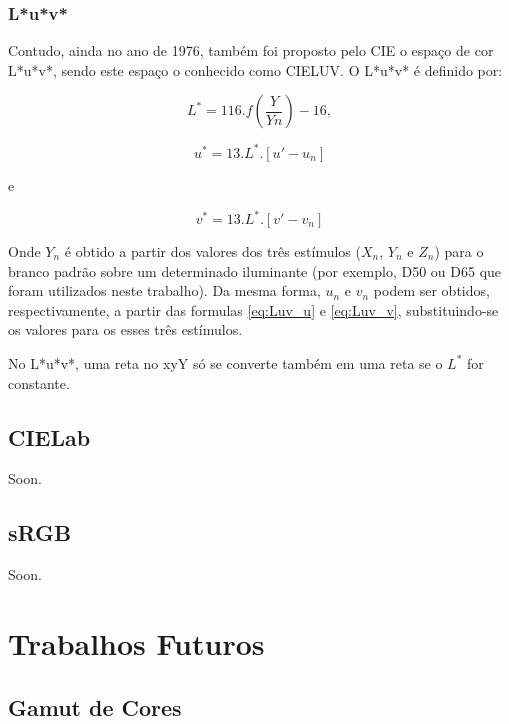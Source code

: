 \documentclass[a4paper,10pt]{report}
\begin{document}
\subsubsection{L*u*v*}
\par
Contudo, ainda no ano de 1976, também foi proposto pelo CIE o espaço de cor
L*u*v*, sendo este espaço o conhecido como CIELUV. O L*u*v* é definido por:

\begin{equation}\label{eq:L*u*v*_L*}
L^*=116.f(\frac{Y}{Yn})-16,
\end{equation}

\begin{equation}\label{eq:L*u*v*_u*}
u^*=13.L^*.[u'-u_n]
\end{equation}

e

\begin{equation}\label{eq:L*u*v*_v*}
v^*=13.L^*.[v'-v_n]
\end{equation}

\par
Onde $Y_n$ é obtido a partir dos valores dos três estímulos ($X_n$, $Y_n$ e
$Z_n$) para o branco padrão sobre um determinado iluminante (por exemplo, D50
ou D65 que foram utilizados neste trabalho). Da mesma forma, $u_n$ e $v_n$
podem ser obtidos, respectivamente, a partir das formulas \ref{eq:Luv_u} e
\ref{eq:Luv_v}, substituindo-se os valores para os esses três estímulos.

\par
No L*u*v*, uma reta no xyY só se converte também em uma reta se o $L^*$ for
constante.



\subsection{CIELab}
Soon.

\subsection{sRGB}
Soon.

\section{Trabalhos Futuros}
\subsection{Gamut de Cores}
\end{document}
